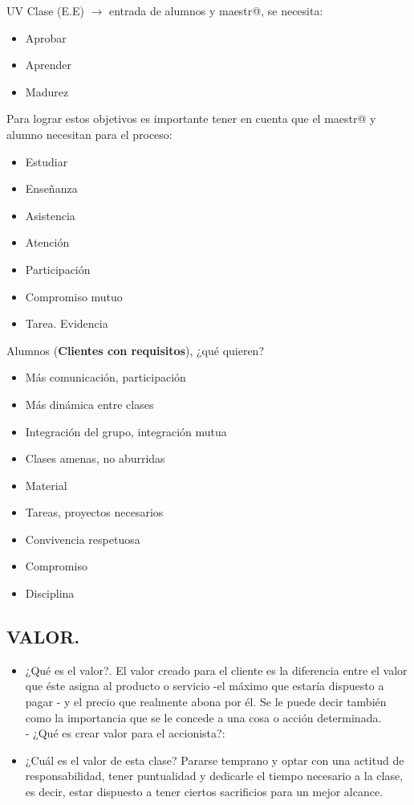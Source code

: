 \documentclass[letterpaper,12pt]{article}
\begin{document}
\begin{sloppypar}
UV Clase (E.E) $\longrightarrow$ entrada de alumnos y maestr@, se necesita:
\begin{itemize}
    \item Aprobar
    \item Aprender
    \item Madurez
\end{itemize}
Para lograr estos objetivos es importante tener en cuenta que el maestr@ y alumno necesitan para el proceso:
\begin{itemize}
    \item Estudiar
    \item Enseñanza 
    \item Asistencia 
    \item Atención
    \item Participación 
    \item Compromiso mutuo 
    \item Tarea. Evidencia 
\end{itemize}
Alumnos (\textbf{Clientes con requisitos}), ¿qué quieren?
\begin{itemize}
    \item Más comunicación, participación 
    \item Más dinámica entre clases
    \item Integración del grupo, integración mutua
    \item Clases amenas, no aburridas 
    \item Material
    \item Tareas, proyectos necesarios 
    \item Convivencia respetuosa
    \item Compromiso
    \item Disciplina 
\end{itemize}
\textcolor[rgb]{0.5,0.5,0.3}{\section{VALOR.}}
\begin{itemize}
    \item ¿Qué es el valor?. El valor creado para el cliente es la diferencia entre el valor que éste asigna al producto o servicio  -el máximo que estaría dispuesto a pagar - y el precio que realmente abona por él. Se le puede decir también como la importancia que se le concede a una cosa o acción determinada. 
    \vspace{0.3cm}\\
    - ¿Qué es crear valor para el accionista?: 
    \item ¿Cuál es el valor de esta clase? Pararse temprano y optar con una actitud de responsabilidad, tener puntualidad y dedicarle el tiempo necesario a la clase, es decir, estar dispuesto a tener ciertos sacrificios para un mejor alcance. 
\end{itemize}\newpage

\end{sloppypar}
\end{document}
